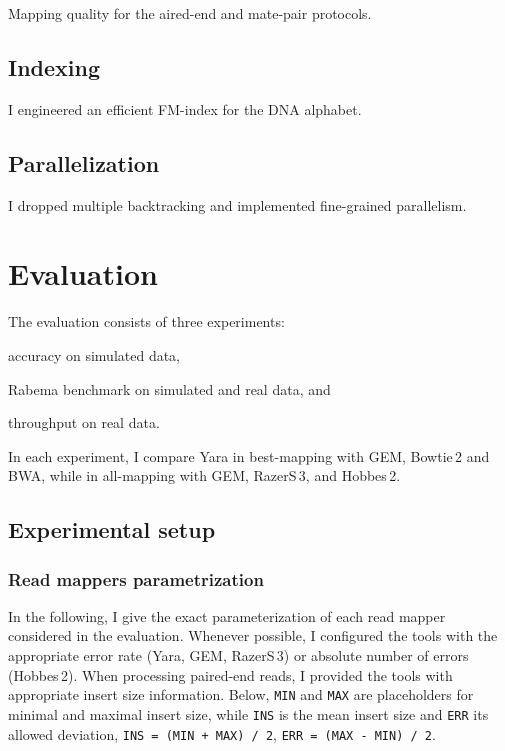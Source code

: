 Mapping quality for the aired-end and mate-pair protocols.

\subsection{Indexing}

I engineered an efficient FM-index for the DNA alphabet.

\subsection{Parallelization}

I dropped multiple backtracking and implemented fine-grained parallelism.



\section{Evaluation}

The evaluation consists of three experiments: \begin{inparaenum}[(i)]
\item accuracy on simulated data,
\item Rabema benchmark on simulated and real data, and
\item throughput on real data.
\end{inparaenum}
In each experiment, I compare Yara in best-mapping with GEM, Bowtie\,2 and BWA, while in all-mapping with GEM, RazerS\,3, and Hobbes\,2.

\subsection{Experimental setup}

\subsubsection{Read mappers parametrization}

In the following, I give the exact parameterization of each read mapper considered in the evaluation.
Whenever possible, I configured the tools with the appropriate error rate (Yara, GEM, RazerS\,3) or absolute number of errors (Hobbes\,2).
When processing paired-end reads, I provided the tools with appropriate insert size information.
Below, \texttt{MIN} and \texttt{MAX} are placeholders for minimal and maximal insert size, while \texttt{INS} is the mean insert size and \texttt{ERR} its allowed deviation, \ie \texttt{INS = (MIN + MAX) / 2}, \texttt{ERR = (MAX - MIN) / 2}.

